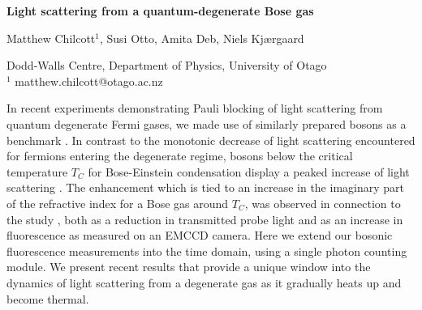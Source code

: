 \documentclass[a4paper]{article}
\begin{document}

\Large
 \begin{center}
\textbf{Light scattering from a quantum-degenerate Bose gas}\\

\hspace{10pt}

\large
Matthew Chilcott$^1$,  Susi Otto, Amita Deb, Niels Kj{\ae}rgaard \\

\hspace{10pt}

\small
Dodd-Walls Centre,  
Department of Physics, University of Otago\\
$^1$ matthew.chilcott@otago.ac.nz\\
\end{center}

\hspace{1pt}
\normalsize
In recent experiments demonstrating Pauli blocking of light scattering from quantum degenerate Fermi gases, we made use of similarly prepared bosons as a benchmark \cite{Deb2021}. In contrast to the monotonic decrease of light scattering encountered for fermions entering the degenerate regime, bosons below the critical temperature $T_C$ for Bose-Einstein condensation display a peaked increase of light scattering \cite{Morice1995,Bons2016}. The enhancement which is tied to an increase in the imaginary part of the refractive index for a Bose gas around $T_C$, was observed in connection to the study \cite{Deb2021}, both as a reduction in transmitted probe light and as an increase in fluorescence as measured on an EMCCD camera. Here we extend our bosonic fluorescence measurements into the time domain, using a single photon counting module. We present recent results that provide a unique window into the dynamics of light scattering from a degenerate gas as it gradually heats up and become thermal.



\end{document}
